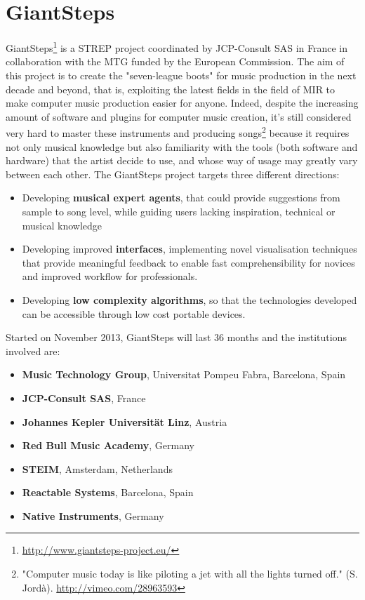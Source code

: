 
\section{GiantSteps}
GiantSteps\footnote{\url{http://www.giantsteps-project.eu/}} is a STREP project coordinated by JCP-Consult SAS in France in collaboration with the MTG funded by the European Commission. The aim of this project is to create the "seven-league boots" for music production in the next decade and beyond, that is, exploiting the latest fields in the field of MIR to make computer music production easier for anyone. Indeed, despite the increasing amount of software and plugins for computer music creation, it's still considered very hard to master these instruments and producing songs\footnote{ "Computer music today is like piloting a jet with all the lights turned off." (S. Jordà). \url{http://vimeo.com/28963593}} because it requires not only musical knowledge but also familiarity with the tools (both software and hardware) that the artist decide to use, and whose way of usage may greatly vary between each other. The GiantSteps project targets three different directions:
\begin{itemize}
\item Developing \textbf{musical expert agents}, that could provide suggestions from sample to song level, while guiding users lacking inspiration, technical or musical knowledge
\item Developing improved \textbf{interfaces}, implementing novel visualisation techniques that provide meaningful feedback to enable fast comprehensibility for novices and improved workflow for professionals.
\item Developing \textbf{low complexity algorithms}, so that the technologies developed can be accessible through low cost portable devices. 
\end{itemize}

Started on November 2013, GiantSteps will last 36 months and the institutions involved are:
\begin{itemize}
\item \textbf{Music Technology Group}, Universitat Pompeu Fabra, Barcelona, Spain
\item \textbf{JCP-Consult SAS}, France
\item \textbf{Johannes Kepler Universität Linz}, Austria
\item \textbf{Red Bull Music Academy}, Germany
\item \textbf{STEIM}, Amsterdam, Netherlands
\item \textbf{Reactable Systems}, Barcelona, Spain
\item \textbf{Native Instruments}, Germany
\end{itemize}

